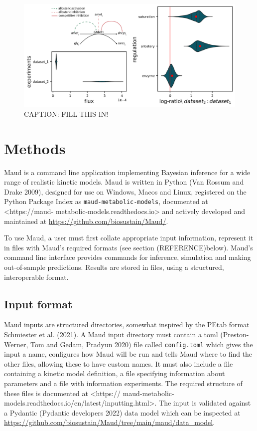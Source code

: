 \documentclass[
  letterpaper,
  DIV=11,
  numbers=noendperiod]{scrartcl}
\begin{document}
\begin{figure}

{\centering \includegraphics{./figures/decomposition.png}

}

\caption{\label{fig-decomposition}CAPTION: FILL THIS IN!}

\end{figure}

\hypertarget{methods}{%
\section{Methods}\label{methods}}

Maud is a command line application implementing Bayesian inference for a
wide range of realistic kinetic models. Maud is written in Python (Van
Rossum and Drake 2009), designed for use on Windows, Macos and Linux,
registered on the Python Package Index as
\texttt{maud-metabolic-models}, documented at \textless https://maud-
metabolic-models.readthedocs.io\textgreater{} and actively developed and
maintained at \url{https://github.com/biosustain/Maud/}.

To use Maud, a user must first collate appropriate input information,
represent it in files with Maud's required formats (see section
(REFERENCE)below). Maud's command line interface provides commands for
inference, simulation and making out-of-sample predictions. Results are
stored in files, using a structured, interoperable format.

\hypertarget{input-format}{%
\subsection{Input format}\label{input-format}}

Maud inputs are structured directories, somewhat inspired by the PEtab
format Schmiester et al. (2021). A Maud input directory must contain a
toml (Preston-Werner, Tom and Gedam, Pradyun 2020) file called
\texttt{config.toml} which gives the input a name, configures how Maud
will be run and tells Maud where to find the other files, allowing these
to have custom names. It must also include a file containing a kinetic
model definition, a file specifying information about parameters and a
file with information experiments. The required structure of these files
is documented at \textless https://
maud-metabolic-models.readthedocs.io/en/latest/inputting.html\textgreater.
The input is validated against a Pydantic (Pydantic developers 2022)
data model which can be inspected at
\url{https://github.com/biosustain/Maud/tree/main/maud/data_model}.
\end{document}
